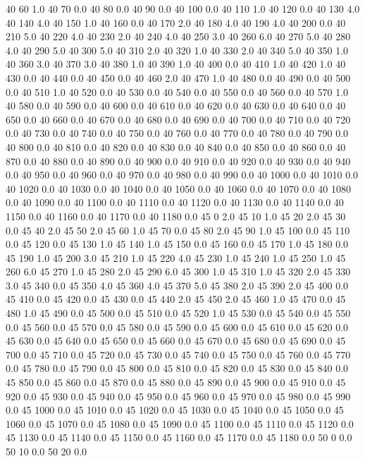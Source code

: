 40	60	1.0
40	70	0.0
40	80	0.0
40	90	0.0
40	100	0.0
40	110	1.0
40	120	0.0
40	130	4.0
40	140	4.0
40	150	1.0
40	160	0.0
40	170	2.0
40	180	4.0
40	190	4.0
40	200	0.0
40	210	5.0
40	220	4.0
40	230	2.0
40	240	4.0
40	250	3.0
40	260	6.0
40	270	5.0
40	280	4.0
40	290	5.0
40	300	5.0
40	310	2.0
40	320	1.0
40	330	2.0
40	340	5.0
40	350	1.0
40	360	3.0
40	370	3.0
40	380	1.0
40	390	1.0
40	400	0.0
40	410	1.0
40	420	1.0
40	430	0.0
40	440	0.0
40	450	0.0
40	460	2.0
40	470	1.0
40	480	0.0
40	490	0.0
40	500	0.0
40	510	1.0
40	520	0.0
40	530	0.0
40	540	0.0
40	550	0.0
40	560	0.0
40	570	1.0
40	580	0.0
40	590	0.0
40	600	0.0
40	610	0.0
40	620	0.0
40	630	0.0
40	640	0.0
40	650	0.0
40	660	0.0
40	670	0.0
40	680	0.0
40	690	0.0
40	700	0.0
40	710	0.0
40	720	0.0
40	730	0.0
40	740	0.0
40	750	0.0
40	760	0.0
40	770	0.0
40	780	0.0
40	790	0.0
40	800	0.0
40	810	0.0
40	820	0.0
40	830	0.0
40	840	0.0
40	850	0.0
40	860	0.0
40	870	0.0
40	880	0.0
40	890	0.0
40	900	0.0
40	910	0.0
40	920	0.0
40	930	0.0
40	940	0.0
40	950	0.0
40	960	0.0
40	970	0.0
40	980	0.0
40	990	0.0
40	1000	0.0
40	1010	0.0
40	1020	0.0
40	1030	0.0
40	1040	0.0
40	1050	0.0
40	1060	0.0
40	1070	0.0
40	1080	0.0
40	1090	0.0
40	1100	0.0
40	1110	0.0
40	1120	0.0
40	1130	0.0
40	1140	0.0
40	1150	0.0
40	1160	0.0
40	1170	0.0
40	1180	0.0
45	0	2.0
45	10	1.0
45	20	2.0
45	30	0.0
45	40	2.0
45	50	2.0
45	60	1.0
45	70	0.0
45	80	2.0
45	90	1.0
45	100	0.0
45	110	0.0
45	120	0.0
45	130	1.0
45	140	1.0
45	150	0.0
45	160	0.0
45	170	1.0
45	180	0.0
45	190	1.0
45	200	3.0
45	210	1.0
45	220	4.0
45	230	1.0
45	240	1.0
45	250	1.0
45	260	6.0
45	270	1.0
45	280	2.0
45	290	6.0
45	300	1.0
45	310	1.0
45	320	2.0
45	330	3.0
45	340	0.0
45	350	4.0
45	360	4.0
45	370	5.0
45	380	2.0
45	390	2.0
45	400	0.0
45	410	0.0
45	420	0.0
45	430	0.0
45	440	2.0
45	450	2.0
45	460	1.0
45	470	0.0
45	480	1.0
45	490	0.0
45	500	0.0
45	510	0.0
45	520	1.0
45	530	0.0
45	540	0.0
45	550	0.0
45	560	0.0
45	570	0.0
45	580	0.0
45	590	0.0
45	600	0.0
45	610	0.0
45	620	0.0
45	630	0.0
45	640	0.0
45	650	0.0
45	660	0.0
45	670	0.0
45	680	0.0
45	690	0.0
45	700	0.0
45	710	0.0
45	720	0.0
45	730	0.0
45	740	0.0
45	750	0.0
45	760	0.0
45	770	0.0
45	780	0.0
45	790	0.0
45	800	0.0
45	810	0.0
45	820	0.0
45	830	0.0
45	840	0.0
45	850	0.0
45	860	0.0
45	870	0.0
45	880	0.0
45	890	0.0
45	900	0.0
45	910	0.0
45	920	0.0
45	930	0.0
45	940	0.0
45	950	0.0
45	960	0.0
45	970	0.0
45	980	0.0
45	990	0.0
45	1000	0.0
45	1010	0.0
45	1020	0.0
45	1030	0.0
45	1040	0.0
45	1050	0.0
45	1060	0.0
45	1070	0.0
45	1080	0.0
45	1090	0.0
45	1100	0.0
45	1110	0.0
45	1120	0.0
45	1130	0.0
45	1140	0.0
45	1150	0.0
45	1160	0.0
45	1170	0.0
45	1180	0.0
50	0	0.0
50	10	0.0
50	20	0.0
